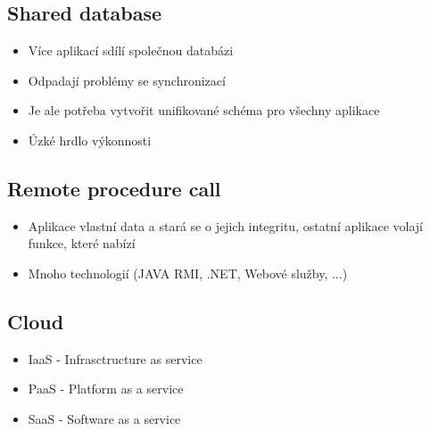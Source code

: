   \subsection{Shared database}
    \begin{itemize}
      \item Více aplikací sdílí společnou databázi
      \item Odpadají problémy se synchronizací
      \item Je ale potřeba vytvořit unifikované schéma pro všechny aplikace
      \item Úzké hrdlo výkonnosti
    \end{itemize}

  \subsection{Remote procedure call}
    \begin{itemize}
      \item Aplikace vlastní data a stará se o jejich integritu, ostatní aplikace volají funkce, které nabízí
      \item Mnoho technologií (JAVA RMI, .NET, Webové služby, ...)
    \end{itemize}

  \subsection{Cloud}
    \begin{itemize}
      \item IaaS - Infrasctructure as service
      \item PaaS - Platform as a service
      \item SaaS - Software as a service
    \end{itemize}
